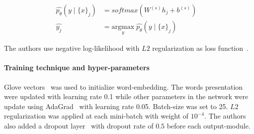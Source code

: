 \begin{align}
      \hat{p_{\theta}}(y \mid \{x\}_j ) &= softmax( W^{(s)} h_j + b^{(s)}) & \\
      \hat{y_j} &= \underset{y}{\mathrm{argmax}} \; \hat{p_{\theta}}(y \mid \{x\}_j ) &
\end{align}

The authors use negative log-likelihood with \(L2\) regularization as loss function~\cite{treeLSTM}.

\paragraph{Training technique and hyper-parameters}
Glove vectors~\cite{glove} was used to initialize word-embedding. 
The words presentation were updated with learning rate 0.1 while other parameters in the network were update using AdaGrad~\cite{adagrad} with learning rate 0.05. 
Batch-size was set to 25. 
\(L2\) regularization was applied at each mini-batch with weight of \(10^{-4}\).
The authors also added a dropout layer~\cite{dropout} with dropout rate of \(0.5\) before each output-module.

